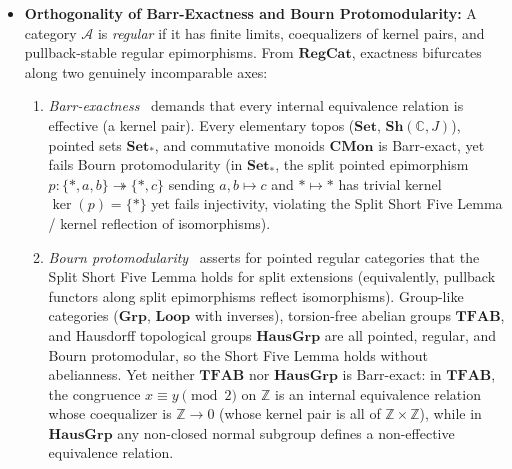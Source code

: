 \begin{itemize}

  \item \textbf{Orthogonality of Barr-Exactness and Bourn Protomodularity:} A category $\mathcal{A}$ is \emph{regular} if it has finite limits, coequalizers of kernel pairs, and pullback-stable regular epimorphisms. From $\mathbf{RegCat}$, exactness bifurcates along two genuinely incomparable axes:
  \begin{enumerate}
    \item \emph{Barr-exactness}~\cite[\S\S A1.3--A1.4]{Johnstone02} demands that every internal equivalence relation is effective (a kernel pair). Every elementary topos ($\mathbf{Set}$, $\mathbf{Sh}(\mathbb{C}, J)$), pointed sets $\mathbf{Set}_*$, and commutative monoids $\mathbf{CMon}$ is Barr-exact, yet fails Bourn protomodularity (in $\mathbf{Set}_*$, the split pointed epimorphism $p : \{*, a, b\} \twoheadrightarrow \{*, c\}$ sending $a, b \mapsto c$ and $* \mapsto *$ has trivial kernel $\ker(p) = \{*\}$ yet fails injectivity, violating the Split Short Five Lemma / kernel reflection of isomorphisms).
    \item \emph{Bourn protomodularity}~\cite{Bourn91} asserts for pointed regular categories that the Split Short Five Lemma holds for split extensions (equivalently, pullback functors along split epimorphisms reflect isomorphisms). Group-like categories ($\mathbf{Grp}$, $\mathbf{Loop}$ with inverses), torsion-free abelian groups $\mathbf{TFAB}$, and Hausdorff topological groups $\mathbf{HausGrp}$ are all pointed, regular, and Bourn protomodular, so the Short Five Lemma holds without abelianness. Yet neither $\mathbf{TFAB}$ nor $\mathbf{HausGrp}$ is Barr-exact: in $\mathbf{TFAB}$, the congruence $x \equiv y \pmod 2$ on $\mathbb{Z}$ is an internal equivalence relation whose coequalizer is $\mathbb{Z} \to 0$ (whose kernel pair is all of $\mathbb{Z} \times \mathbb{Z}$), while in $\mathbf{HausGrp}$ any non-closed normal subgroup defines a non-effective equivalence relation.
  \end{enumerate}


\end{itemize}
